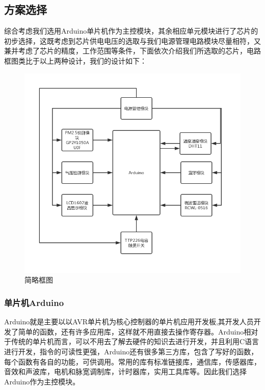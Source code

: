 \documentclass[a4paper, 11pt]{article} %
\begin{document}
\subsection{方案选择}
\par{} 综合考虑我们选用Arduino单片机作为主控模块，其余相应单元模块进行了芯片的初步选择，这既考虑到芯片供电电压的选取与我们电源管理电路模块尽量相符，又兼并考虑了芯片的精度，工作范围等条件，下面依次介绍我们所选取的芯片，电路框图类比于以上两种设计，我们的设计如下：
\begin{figure}[H]
  \centering
  \includegraphics[scale = 0.45 ]{1-n.png}
  \caption{简略框图}
  \label{img6} 
\end{figure}
\subsubsection{单片机Arduino}
\par{} Arduino就是主要以以AVR单片机为核心控制器的单片机应用开发板,其开发人员开发了简单的函数，还有许多应用库，这样就不用直接去操作寄存器。Arduino相对于传统的单片机而言，可以不用去了解去硬件的知识去进行开发，并且利用C语言进行开发，指令的可读性更强，Arduino还有很多第三方库，包含了写好的函数，每个函数有各自的功能，可供调用。常用的库有标准链接库，通信库，传感器库，音效和声波库，电机和脉宽调制库，计时器库，实用工具库等。因此我们选择Arduino作为主控模块。
\end{document}
